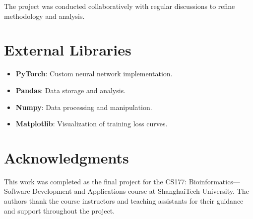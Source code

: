 \documentclass[unnumsec,webpdf,contemporary,large]{oup-authoring-template}
\theoremstyle{thmstyleone}%
\theoremstyle{thmstyletwo}%
\theoremstyle{thmstylethree}%
\begin{document}
The project was conducted collaboratively with regular 
discussions to refine methodology and analysis.

\section{External Libraries}

\begin{itemize}
    \item \textbf{PyTorch}: Custom neural network implementation.
    \item \textbf{Pandas}: Data storage and analysis.
    \item \textbf{Numpy}: Data processing and manipulation.
    \item \textbf{Matplotlib}: Visualization of training loss curves.
\end{itemize}

\section{Acknowledgments}
This work was completed as the final project for the CS177: Bioinformatics—Software Development 
and Applications course at ShanghaiTech University. 
The authors thank the course instructors and teaching assistants 
for their guidance and support throughout the project.




\end{document}

